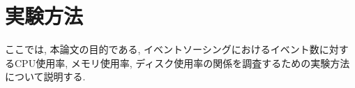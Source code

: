 \documentclass[../../main]{subfiles}
\begin{document}
    \section{実験方法}\label{sec:method}

    ここでは, 本論文の目的である, イベントソーシングにおけるイベント数に対するCPU使用率, メモリ使用率, ディスク使用率の関係を調査するための実験方法について説明する.

    

    

    

    

    
\end{document}
